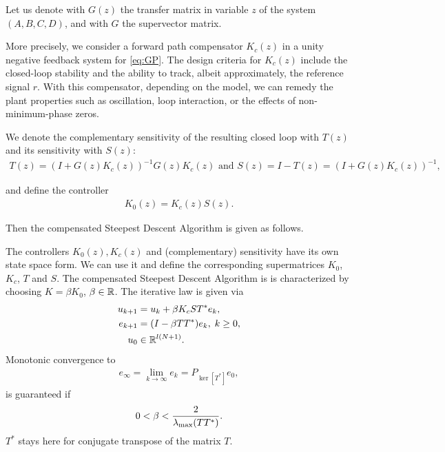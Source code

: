 Let us denote with $G(z)$ the transfer matrix in variable $z$ of the system $(A,B,C,D)$, and with $G$ the supervector matrix. 

More precisely, we consider a forward path compensator $K_c(z)$ in a unity negative feedback system for \eqref{eq:GP}. 
The design criteria for $K_c(z)$ include the closed-loop stability and the ability to track, albeit approximately, the reference signal $r$. With this compensator, depending on the model, we can remedy the plant properties such as oscillation, loop interaction, or the effects of non-minimum-phase zeros. 

We denote the complementary sensitivity of the resulting closed loop with $T(z)$ and its sensitivity with $S(z)$:
\begin{align}
T(z) = (I + G(z) K_c(z))^{-1}G(z) K_c(z) \text{ and } S(z)  = I - T(z) =  (I + G(z) K_c(z))^{-1}, 
\end{align}

and define the controller
\begin{align}
K_0(z) = K_c(z) S(z). 
\end{align}

Then the compensated Steepest Descent Algorithm is given as follows. 

\begin{alg}
	\label{alg: FBDesign}
	The controllers $K_0(z), K_c(z)$ and (complementary) sensitivity have its own state space form. We can use it and define the corresponding supermatrices 
	$K_0$, $K_c$, $T$ and $S$. The compensated Steepest Descent Algorithm is  is characterized by choosing  $K = \beta K_0$, $\beta \in {\mathbb{R}}$. 
	The iterative law is given via 
	\begin{align}
	\label{eq:errFBDesign}
	\begin{split}
	u_{k+1} &= u_k + \beta K_c S T^* e_k, \\
	e_{k+1} &= (I- \beta T T^*) e_{k}, \; k\geq 0,\\
	u_0& \in {\mathbb{R}}^{l (N+1)}. 
	\end{split}	
	\end{align}
	Monotonic convergence to 
	\begin{align}
	\label{eq:FDErrLim} 
	e_\infty  = \lim_{k\to\infty} e_k = P_{\ker[T^*]}e_0,
	\end{align} 
	is guaranteed if
	\begin{align*}
	0 <\beta < \frac{2}{\lambda_{\mathrm{max}}(T T^*)}.
\end{align*}
$T^*$ stays here for conjugate transpose of the matrix $T$. 
\end{alg}


